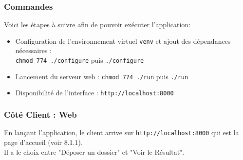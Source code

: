 \documentclass{article}
\begin{document}
    \subsubsection{Commandes}
Voici les étapes à suivre afin de pouvoir exécuter l'application:
\begin{itemize}
    \item Configuration de l'environnement virtuel \texttt{venv} et ajout des dépendances nécessaires : \\
    \texttt{chmod 774 ./configure} puis \texttt{./configure}
    \item Lancement du serveur web : \texttt{chmod 774 ./run} puis \texttt{./run}
    \item Disponibilité de l'interface : \texttt{http://localhost:8000}
\end{itemize}

    \subsubsection{Côté Client : Web}
    En lançant l'application, le client arrive sur \texttt{http://localhost:8000} qui est la page d'accueil (voir 8.1.1). \\
    Il a le choix entre "Déposer un dossier" et "Voir le Résultat". 
    
    \newpage
    
\end{document}
